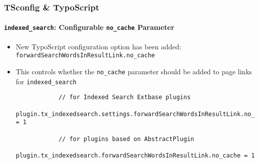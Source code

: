 \begin{frame}[fragile]
	\frametitle{TSconfig \& TypoScript}
	\framesubtitle{\texttt{indexed\_search}: Configurable \texttt{no\_cache} Parameter}

	\lstset{basicstyle=\tiny\ttfamily}

	\begin{itemize}

		\item New TypoScript configuration option has been added:\newline
			 \texttt{forwardSearchWordsInResultLink.no\_cache}

		\item This controls whether the \texttt{no\_cache} parameter should be added to page links
			for \texttt{indexed\_search}

		\begin{lstlisting}
			// for Indexed Search Extbase plugins
			plugin.tx_indexedsearch.settings.forwardSearchWordsInResultLink.no_cache = 1

			// for plugins based on AbstractPlugin
			plugin.tx_indexedsearch.forwardSearchWordsInResultLink.no_cache = 1
		\end{lstlisting}

	\end{itemize}

\end{frame}


